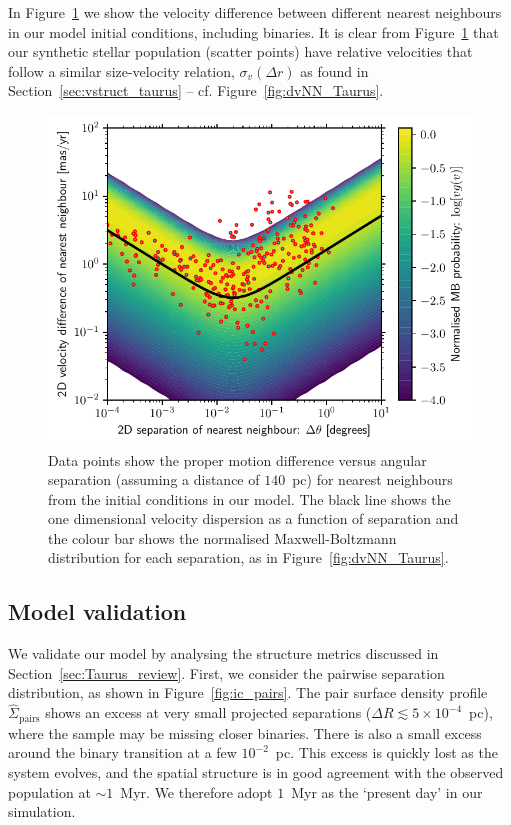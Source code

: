 \documentclass{aa}
\begin{document}
In Figure~\ref{fig:vdist_3D_IC} we show the velocity difference between different nearest neighbours in our model initial conditions, including binaries. It is clear from Figure~\ref{fig:vdist_3D_IC} that our synthetic stellar population (scatter points) have relative velocities that follow a similar size-velocity relation, $\sigma_v(\Delta r)$ as found in Section~\ref{sec:vstruct_taurus} -- cf. Figure~\ref{fig:dvNN_Taurus}. 

\begin{figure}
    \centering
    \includegraphics[width=\columnwidth]{Figures/vdist_2D_init.pdf}
    \caption{Data points show the proper motion difference versus angular separation (assuming a distance of $140$~pc) for nearest neighbours from the initial conditions in our model. The black line shows the one dimensional velocity dispersion as a function of separation and the colour bar shows the normalised Maxwell-Boltzmann distribution for each separation, as in Figure~\ref{fig:dvNN_Taurus}.}
    \label{fig:vdist_3D_IC}
\end{figure}









\subsection{Model validation}
\label{sec:validate}

We validate our model by analysing the structure metrics discussed in Section~\ref{sec:Taurus_review}. First, we consider the pairwise separation distribution, as shown in Figure~\ref{fig:ic_pairs}. The pair surface density profile $\hat{\Sigma}_\mathrm{pairs}$ shows an excess at very small projected separations ($\Delta R \lesssim 5 \times 10^{-4}$~pc), where the \citet{Luhman23} sample may be missing closer binaries. There is also a small excess around the binary transition at a few $10^{-2}$~pc. This excess is quickly lost as the system evolves, and the spatial structure is in good agreement with the observed population at $\sim 1$~Myr. We therefore adopt $1$~Myr as the `present day' in our simulation. 
\end{document}
